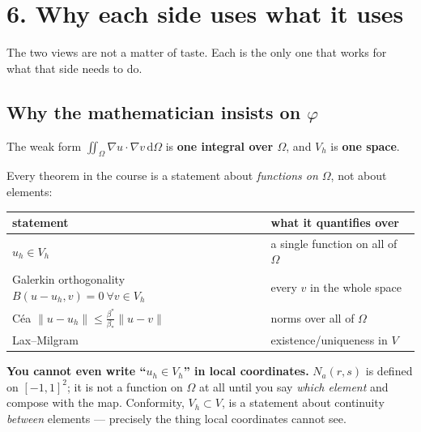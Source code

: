 \documentclass[11pt]{article}
\newcommand{\dOm}{\,\mathrm{d}\Omega}
\newcommand{\norm}[1]{\lVert #1\rVert}
\newcommand{\grad}{\nabla}
\begin{document}
\section*{6. Why each side uses what it uses}

The two views are not a matter of taste. Each is the only one that works for
what that side needs to do.

\subsection*{Why the mathematician insists on $\varphi$}

\begin{steps}
\item The weak form $\displaystyle\iint_{\Omega}\grad u\cdot\grad v\dOm$ is
      \textbf{one integral over $\Omega$}, and $V_{h}$ is \textbf{one space}.
\item Every theorem in the course is a statement about \emph{functions on
      $\Omega$}, not about elements:
      \begin{center}\small
      \renewcommand{\arraystretch}{1.25}
      \begin{tabular}{@{}ll@{}}
      \toprule
      statement & what it quantifies over\\
      \midrule
      $u_{h}\in V_{h}$ & a single function on all of $\Omega$\\
      Galerkin orthogonality $B(u-u_{h},v)=0\ \forall v\in V_{h}$ & every $v$ in the whole space\\
      C\'ea $\norm{u-u_{h}}\le\frac{\beta^{*}}{\beta_{*}}\norm{u-v}$ & norms over all of $\Omega$\\
      Lax--Milgram & existence/uniqueness in $V$\\
      \bottomrule
      \end{tabular}
      \end{center}
\item \textbf{You cannot even write ``$u_{h}\in V_{h}$'' in local coordinates.}
      $N_{a}(r,s)$ is defined on $[-1,1]^{2}$; it is not a function on
      $\Omega$ at all until you say \emph{which element} and compose with the
      map. Conformity, $V_{h}\subset V$, is a statement about continuity
      \emph{between} elements --- precisely the thing local coordinates cannot
      see.
\end{steps}
\end{document}
